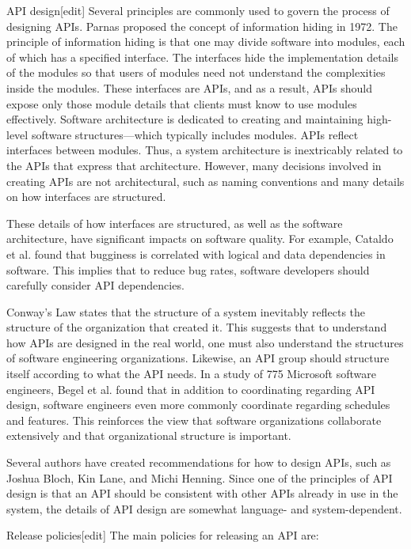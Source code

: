 API design[edit]
Several principles are commonly used to govern the process of designing APIs.
 Parnas proposed the concept of information hiding in 1972. The principle of information hiding is that one may divide software into modules, each of which has a specified interface. 
 The interfaces hide the implementation details of the modules so that users of modules need not understand the complexities inside the modules. 
 These interfaces are APIs, and as a result, APIs should expose only those module details that clients must know to use modules effectively. 
 Software architecture is dedicated to creating and maintaining high-level software structures—which typically includes modules. 
 APIs reflect interfaces between modules. Thus, a system architecture is inextricably related to the APIs that express that architecture. However, many decisions involved in creating APIs are not architectural, such as naming conventions and many details on how interfaces are structured.

These details of how interfaces are structured, as well as the software architecture, have significant impacts on software quality. 
For example, Cataldo et al. found that bugginess is correlated with logical and data dependencies in software.
This implies that to reduce bug rates, software developers should carefully consider API dependencies.

Conway's Law states that the structure of a system inevitably reflects the structure of the organization that created it. 
This suggests that to understand how APIs are designed in the real world, one must also understand the structures of software engineering organizations.
 Likewise, an API group should structure itself according to what the API needs. 
 In a study of 775 Microsoft software engineers, Begel et al. found that in addition to coordinating regarding API design, software engineers even more commonly coordinate regarding schedules and features.
 This reinforces the view that software organizations collaborate extensively and that organizational structure is important.

Several authors have created recommendations for how to design APIs, such as Joshua Bloch, Kin Lane, and Michi Henning. 
Since one of the principles of API design is that an API should be consistent with other APIs already in use in the system, the details of API design are somewhat language- and system-dependent.

Release policies[edit]
The main policies for releasing an API are:

